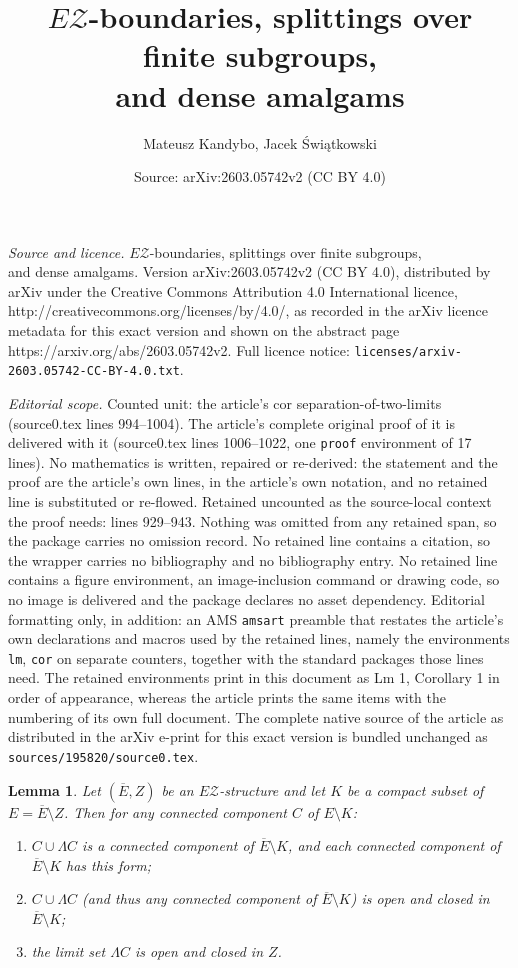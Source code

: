 \documentclass[10pt,a4paper]{amsart}
\title{$E\mathcal{Z}$-boundaries, splittings over finite subgroups, \\and dense amalgams}
\author{Mateusz Kandybo, Jacek \'Swi\k{a}tkowski}
\date{Source: arXiv:2603.05742v2 (CC BY 4.0)}
\newtheorem{lm}{Lemma}
\newcommand{\ol}[1]{\overline{#1}}
\begin{document}
\maketitle

\noindent\emph{Source and licence.} $E\mathcal{Z}$-boundaries, splittings over finite subgroups, \\and dense amalgams. Version arXiv:2603.05742v2 (CC BY 4.0), distributed by arXiv under the Creative Commons Attribution 4.0 International licence, http://creativecommons.org/licenses/by/4.0/, as recorded in the arXiv licence metadata for this exact version and shown on the abstract page https://arxiv.org/abs/2603.05742v2. Full licence notice: \texttt{licenses/arxiv-2603.05742-CC-BY-4.0.txt}.\par\smallskip

\noindent\textit{Editorial scope.} Counted unit: the article's cor separation-of-two-limits (source0.tex lines 994--1004). The article's complete original proof of it is delivered with it (source0.tex lines 1006--1022, one \texttt{proof} environment of 17 lines). No mathematics is written, repaired or re-derived: the statement and the proof are the article's own lines, in the article's own notation, and no retained line is substituted or re-flowed.  Retained uncounted as the source-local context the proof needs: lines 929--943.  Nothing was omitted from any retained span, so the package carries no omission record.  No retained line contains a citation, so the wrapper carries no bibliography and no bibliography entry.  No retained line contains a figure environment, an image-inclusion command or drawing code, so no image is delivered and the package declares no asset dependency.  Editorial formatting only, in addition: an AMS \texttt{amsart} preamble that restates the article's own declarations and macros used by the retained lines, namely the environments \texttt{lm}, \texttt{cor} on separate counters, together with the standard packages those lines need.  The retained environments print in this document as Lm 1, Corollary 1 in order of appearance, whereas the article prints the same items with the numbering of its own full document.  The complete native source of the article as distributed in the arXiv e-print for this exact version is bundled unchanged as \texttt{sources/195820/source0.tex}.
\begin{lm}\label{form-of-component}
Let $(\ol E,Z)$ be an $E\mathcal{Z}$-structure and let $K$ be a compact
subset of $E=\ol E\setminus Z$. Then for any connected component $C$
of $E\setminus K$:
\begin{enumerate}
\item
$C\cup\Lambda C$ is a connected component of $\ol E\setminus K$,
and each connected component of $\ol E\setminus K$ has this form;
\item
$C\cup\Lambda C$ (and thus any connected component of 
$\ol E\setminus K$) is open and closed in $\ol E\setminus K$;
\item
the limit set $\Lambda C$ is open and closed in $Z$.
\end{enumerate}
\end{lm}
\end{document}
